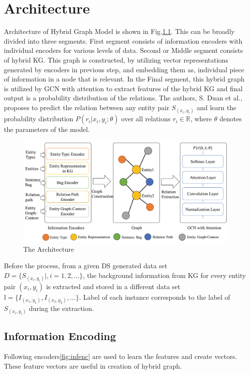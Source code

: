 \chapter{Architecture}
\label{ch:architecture}

Architecture of Hybrid Graph Model is shown in Fig.\ref{fig:arch}. This can be broadly divided into three segments. First segment consists of information encoders with individual encoders for various levels of data. Second or Middle segment consists of hybrid KG. This graph is constructed, by utilizing vector representations generated by encoders in previous step, and embedding them as, individual piece of information in a node that is relevant. In the Final segment, this hybrid graph is utilized by GCN with attention to extract features of the hybrid KG and final output is a probability distribution of the relations. The authors, S. Duan et al.\cite{duan2019hybrid}, proposes to predict the relation between any entity pair $S_{(x_i, y_i)}$ and learn the probability distribution $P(r_i|x_i,y_i;\theta)$ over all relations $r_i \in \mathbb{R}$, where $\theta$ denotes the parameters of the model.

\begin{figure}[h!]
	\centering
	\includegraphics[scale=0.25]{figures/architecture.PNG}
	\caption{The Architecture}
	\label{fig:arch}
\end{figure}

\newpar
Before the process, from a given DS generated data set $D = \{S_{(x_i,y_i)}|,i = 1,2,...\}$, the background information from KG for every entity pair $(x_i, y_i)$ is extracted and stored in a different data set $\mathbb{I} = \{I_{(x_1,y_1)},I_{(x_2,y_2)},...\}$. Label of each instance corresponds to the label of $S_{(x_i, y_i)}$ during the extraction. 

\section{Information Encoding}
Following encoders\ref{fig:infenc} are used to learn the features and create vectors. These feature vectors are useful in creation of hybrid graph.


